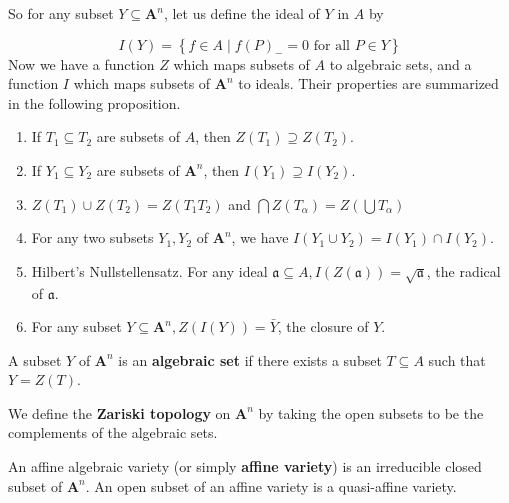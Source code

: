 \documentclass[12pt, oneside]{book}
\begin{document}
So for any subset $Y \subseteq \mathbf{A}^n$, let us define the ideal of $Y$ in $A$ by

\begin{equation*}
    I(Y)=\left\{f \in A \mid f(P)_{-}=0 \text { for all } P \in Y\right\}
\end{equation*}
Now we have a function $Z$ which maps subsets of $A$ to algebraic sets, and a function $I$ which maps subsets of $\mathbf{A}^n$ to ideals. Their properties are summarized in the following proposition.


\begin{proposition}
    \begin{enumerate}
        \item
              If $T_1 \subseteq T_2$ are subsets of $A$, then $Z\left(T_1\right) \supseteq Z\left(T_2\right)$.
        \item
              If $Y_1 \subseteq Y_2$ are subsets of $\mathbf{A}^n$, then $I\left(Y_1\right) \supseteq I\left(Y_2\right)$.
        \item $Z(T_1)\cup Z(T_2) = Z(T_1 T_2)$ and $\bigcap Z(T_\alpha)=Z(\bigcup T_\alpha)$
        \item
              For any two subsets $Y_1, Y_2$ of $\mathbf{A}^n$, we have $I\left(Y_1 \cup Y_2\right)=I\left(Y_1\right) \cap I\left(Y_2\right)$.
        \item
              Hilbert's Nullstellensatz.
              For any ideal $\mathfrak{a} \subseteq A, I(Z(\mathfrak{a}))=\sqrt{\mathfrak{a}}$, the radical of $\mathfrak{a}$.
        \item
              For any subset $Y \subseteq \mathbf{A}^n, Z(I(Y))=\bar{Y}$, the closure of $Y$.
    \end{enumerate}
\end{proposition}


\begin{definition}
    A subset $Y$ of $\mathbf{A}^n$ is an \textbf{algebraic set} if there exists a subset $T \subseteq A$ such that $Y=Z(T)$.
\end{definition}


\begin{definition}
    We define the \textbf{Zariski topology} on $\mathbf{A}^n$ by taking the open subsets to be the complements of the algebraic sets.
\end{definition}

\begin{definition}
    An affine algebraic variety (or simply \textbf{affine variety}) is an irreducible closed subset of $\mathbf{A}^n$.
    An open subset of an affine variety is a quasi-affine variety.

\end{definition}
\end{document}
